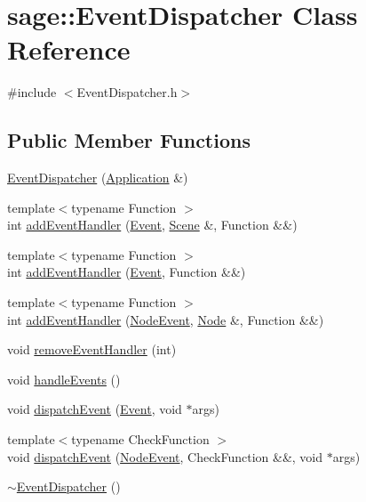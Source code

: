 \hypertarget{classsage_1_1EventDispatcher}{}\section{sage\+::Event\+Dispatcher Class Reference}
\label{classsage_1_1EventDispatcher}


{\ttfamily \#include $<$Event\+Dispatcher.\+h$>$}

\subsection*{Public Member Functions}
\begin{DoxyCompactItemize}
\item 
\mbox{\hyperlink{classsage_1_1EventDispatcher_aa80c440a5ba6379d084f616417ce0958}{Event\+Dispatcher}} (\mbox{\hyperlink{classsage_1_1Application}{Application}} \&)
\item 
{\footnotesize template$<$typename Function $>$ }\\int \mbox{\hyperlink{classsage_1_1EventDispatcher_a1d1e2ee2c7731d0322cd65166d9d35b0}{add\+Event\+Handler}} (\mbox{\hyperlink{namespacesage_afe706a25026cc74fe69b56d53a265d29}{Event}}, \mbox{\hyperlink{classsage_1_1Scene}{Scene}} \&, Function \&\&)
\item 
{\footnotesize template$<$typename Function $>$ }\\int \mbox{\hyperlink{classsage_1_1EventDispatcher_a0f27316ccad82d3b7697dd835964741d}{add\+Event\+Handler}} (\mbox{\hyperlink{namespacesage_afe706a25026cc74fe69b56d53a265d29}{Event}}, Function \&\&)
\item 
{\footnotesize template$<$typename Function $>$ }\\int \mbox{\hyperlink{classsage_1_1EventDispatcher_ac7121d7fde0bd5bd5e1be07f5c41a45f}{add\+Event\+Handler}} (\mbox{\hyperlink{namespacesage_ad2c7b0e1ebf67f572d43620e6b07aa13}{Node\+Event}}, \mbox{\hyperlink{classsage_1_1Node}{Node}} \&, Function \&\&)
\item 
void \mbox{\hyperlink{classsage_1_1EventDispatcher_a79f655113b28c14ee6a86fa5ed7ec238}{remove\+Event\+Handler}} (int)
\item 
void \mbox{\hyperlink{classsage_1_1EventDispatcher_af94b0101f87f16334c1d32ea7a43c02a}{handle\+Events}} ()
\item 
void \mbox{\hyperlink{classsage_1_1EventDispatcher_a6f524699d0a3aaeed1544f634a88d9a1}{dispatch\+Event}} (\mbox{\hyperlink{namespacesage_afe706a25026cc74fe69b56d53a265d29}{Event}}, void $\ast$args)
\item 
{\footnotesize template$<$typename Check\+Function $>$ }\\void \mbox{\hyperlink{classsage_1_1EventDispatcher_a221273dabb73d06858598cd42db79902}{dispatch\+Event}} (\mbox{\hyperlink{namespacesage_ad2c7b0e1ebf67f572d43620e6b07aa13}{Node\+Event}}, Check\+Function \&\&, void $\ast$args)
\item 
\mbox{\hyperlink{classsage_1_1EventDispatcher_abb5f401014e87f03027d6c4450964e55}{$\sim$\+Event\+Dispatcher}} ()
\end{DoxyCompactItemize}
